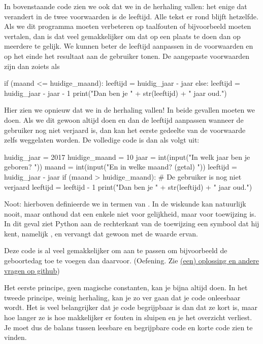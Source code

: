   In bovenstaande code zien we ook dat we in de herhaling vallen: het
  enige dat verandert in de twee voorwaarden is de leeftijd. Alle tekst er rond
  blijft hetzelfde. Als we dit programma moeten verbeteren op taalfouten of
  bijvoorbeeld moeten vertalen, dan is dat veel gemakkelijker om dat op een
  plaats te doen dan op meerdere te gelijk. We kunnen beter de leeftijd
  aanpassen in de voorwaarden en op het einde het resultaat aan de gebruiker
  tonen. De aangepaste voorwaarden zijn dan zoiets als
  \begin{python}
    if (maand <= huidige_maand):
      leeftijd = huidig_jaar - jaar
    else:
      leeftijd = huidig_jaar - jaar - 1
    print("Dan ben je " + str(leeftijd) + " jaar oud.")
  \end{python}
  Hier zien we opnieuw dat we in de herhaling vallen! In beide gevallen moeten
  we  doen. Als we dit gewoon altijd doen en dan de
  leeftijd aanpassen wanneer de gebruiker nog niet verjaard is, dan kan het
  eerste gedeelte van de voorwaarde zelfs weggelaten worden. De volledige code
  is dan als volgt uit:
  \begin{python}
    huidig_jaar   = 2017
    huidige_maand = 10
    jaar  = int(input("In welk jaar ben je geboren? "))
    maand = int(input("En in welke maand? (getal) "))
    leeftijd = huidig_jaar - jaar
    if (maand > huidige_maand):
      # De gebruiker is nog niet verjaard
      leeftijd = leeftijd - 1
    print("Dan ben je " + str(leeftijd) + " jaar oud.")
  \end{python}
  Noot: hierboven definieerde we  in termen van . In
  de wiskunde kan  natuurlijk nooit, maar onthoud dat een
  enkele \py{=} niet voor gelijkheid, maar voor toewijzing is. In dit geval ziet
  Python aan de rechterkant van de toewijzing een symbool dat hij kent, namelijk
  , en vervangt dat gewoon met de waarde ervan.

  Deze code is al veel gemakkelijker om aan te passen om bijvoorbeeld de
  geboortedag toe te voegen dan daarvoor. (Oefening. Zie
  \href{https://github.com/TGThorax/python-ka2ring/blob/master/src/leeftijd.py}%
  {(een) oplossing en andere vragen op github})

  Het eerste principe, geen magische constanten, kan je bijna altijd doen. In
  het tweede principe, weinig herhaling, kan je zo ver gaan dat je code
  onleesbaar wordt. Het is veel belangrijker dat je code begrijpbaar is dan dat
  ze kort is, maar hoe langer ze is hoe makkelijker er fouten in sluipen en je
  het overzicht verliest. Je moet dus de balans tussen leesbare en begrijpbare
  code en korte code zien te vinden.

